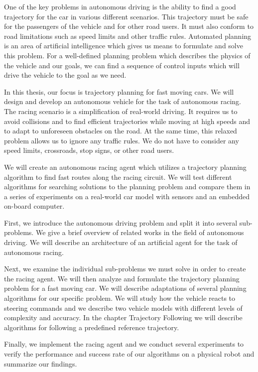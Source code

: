 One of the key problems in autonomous driving is the ability to find a good trajectory for the car in various different scenarios. This trajectory must be safe for the passengers of the vehicle and for other road users. It must also conform to road limitations such as speed limits and other traffic rules. Automated planning is an area of artificial intelligence which gives us means to formulate and solve this problem. For a well-defined planning problem which describes the physics of the vehicle and our goals, we can find a sequence of control inputs which will drive the vehicle to the goal as we need.

In this thesis, our focus is trajectory planning for fast moving cars. We will design and develop an autonomous vehicle for the task of autonomous racing. The racing scenario is a simplification of real-world driving. It requires us to avoid collisions and to find efficient trajectories while moving at high speeds and to adapt to unforeseen obstacles on the road. At the same time, this relaxed problem allows us to ignore any traffic rules. We do not have to consider any speed limits, crossroads, stop signs, or other road users.

We will create an autonomous racing agent which utilizes a trajectory planning algorithm to find fast routes along the racing circuit. We will test different algorithms for searching solutions to the planning problem and compare them in a series of experiments on a real-world car model with sensors and an embedded on-board computer.

First, we introduce the autonomous driving problem and split it into several sub-problems. We give a brief overview of related works in the field of autonomous driving. We will describe an architecture of an artificial agent for the task of autonomous racing.

Next, we examine the individual sub-problems we must solve in order to create the racing agent. We will then analyze and formulate the trajectory planning problem for a fast moving car. We will describe adaptations of several planning algorithms for our specific problem. We will study how the vehicle reacts to steering commands and we describe two vehicle models with different levels of complexity and accuracy. In the chapter Trajectory Following we will describe algorithms for following a predefined reference trajectory.

Finally, we implement the racing agent and we conduct several experiments to verify the performance and success rate of our algorithms on a physical robot and summarize our findings.
